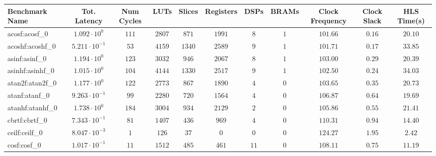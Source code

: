 \begin{tabular}{|l|c|c|c|c|c|c|c|c|c|c|}
\hline
Benchmark Name               & Tot. Latency            & Num Cycles & LUTs      & Slices    & Registers & DSPs    & BRAMs & Clock Frequency & Clock Slack & HLS Time(s) \\
\hline
acosf:acosf\_0               & $ 1.092 \cdot 10^{0}  $ & $ 111    $ & $ 2807  $ & $ 871   $ & $ 1991  $ & $ 8   $ & $ 1 $ & $ 101.66      $ & $ 0.16    $ & $ 20.10   $ \\
acoshf:acoshf\_0             & $ 5.211 \cdot 10^{-1} $ & $ 53     $ & $ 4159  $ & $ 1340  $ & $ 2589  $ & $ 9   $ & $ 1 $ & $ 101.71      $ & $ 0.17    $ & $ 33.85   $ \\
asinf:asinf\_0               & $ 1.194 \cdot 10^{0}  $ & $ 123    $ & $ 3032  $ & $ 946   $ & $ 2067  $ & $ 8   $ & $ 1 $ & $ 103.00      $ & $ 0.29    $ & $ 20.39   $ \\
asinhf:asinhf\_0             & $ 1.015 \cdot 10^{0}  $ & $ 104    $ & $ 4144  $ & $ 1330  $ & $ 2517  $ & $ 9   $ & $ 1 $ & $ 102.50      $ & $ 0.24    $ & $ 34.03   $ \\
atan2f:atan2f\_0             & $ 1.177 \cdot 10^{0}  $ & $ 122    $ & $ 2773  $ & $ 867   $ & $ 1890  $ & $ 4   $ & $ 0 $ & $ 103.65      $ & $ 0.35    $ & $ 20.73   $ \\
atanf:atanf\_0               & $ 9.263 \cdot 10^{-1} $ & $ 99     $ & $ 2280  $ & $ 720   $ & $ 1564  $ & $ 4   $ & $ 0 $ & $ 106.87      $ & $ 0.64    $ & $ 19.69   $ \\
atanhf:atanhf\_0             & $ 1.738 \cdot 10^{0}  $ & $ 184    $ & $ 3004  $ & $ 934   $ & $ 2129  $ & $ 2   $ & $ 0 $ & $ 105.86      $ & $ 0.55    $ & $ 21.41   $ \\
cbrtf:cbrtf\_0               & $ 7.343 \cdot 10^{-1} $ & $ 81     $ & $ 1407  $ & $ 436   $ & $ 969   $ & $ 4   $ & $ 0 $ & $ 110.31      $ & $ 0.94    $ & $ 14.40   $ \\
ceilf:ceilf\_0               & $ 8.047 \cdot 10^{-3} $ & $ 1      $ & $ 126   $ & $ 37    $ & $ 0     $ & $ 0   $ & $ 0 $ & $ 124.27      $ & $ 1.95    $ & $ 2.42    $ \\
cosf:cosf\_0                 & $ 1.017 \cdot 10^{-1} $ & $ 11     $ & $ 1512  $ & $ 485   $ & $ 461   $ & $ 11  $ & $ 0 $ & $ 108.11      $ & $ 0.75    $ & $ 11.19   $ \\

\end{tabular}
